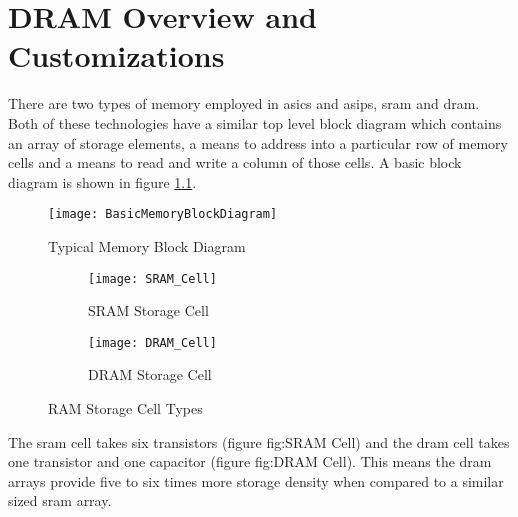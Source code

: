 
\chapter{DRAM Overview and Customizations}
\label{sec:DRAM Customizations}

There are two types of memory employed in \acp{asic} and \acp{asip}, \acf{sram} and \acf{dram}.
Both of these technologies have a similar top level block diagram which contains an array of storage elements, a means to address into a particular row of memory cells and a means to read and write a column of those cells.
A basic block diagram is shown in figure \ref{fig:MemoryBlockDiagram}.
\begin{figure}[!t]
\centering
\captionsetup{justification=centering}
\centerline{
\mbox{\texttt{[image: BasicMemoryBlockDiagram]}}
}
\caption{Typical Memory Block Diagram \cite{Jacob:2007:MSC:1543376}}
\label{fig:MemoryBlockDiagram}
\end{figure}


\begin{figure}
\centering
\begin{subfigure}{.45\textwidth}
  \centering
  \texttt{[image: SRAM\_Cell]}
  \captionsetup{justification=centering, skip=5pt}
  \vspace{-6pt}
  \caption{SRAM Storage Cell \cite{Jacob:2007:MSC:1543376}}
  \label{fig:SRAM Cell}
\end{subfigure}%
\begin{subfigure}{.45\textwidth}
  \centering
  \texttt{[image: DRAM\_Cell]}
  \captionsetup{justification=centering, skip=5pt}
  \vspace{20pt}
  \caption{DRAM Storage Cell \cite{Jacob:2007:MSC:1543376}}
  \label{fig:DRAM Cell}
\end{subfigure}
\captionsetup{justification=centering, skip=12pt}
\caption{RAM Storage Cell Types}
\label{fig:Memory Storage Cells}
\end{figure}

\iffalse The major difference between the \ac{sram} cell and \ac{dram} cell is the number of elements it takes to implement. \fi
The \ac{sram} cell takes six transistors (figure fig:SRAM Cell) and the \ac{dram} cell takes one transistor and one capacitor (figure fig:DRAM Cell).
This means the \ac{dram} arrays provide five to six times more storage density when compared to a similar sized \ac{sram} array.

